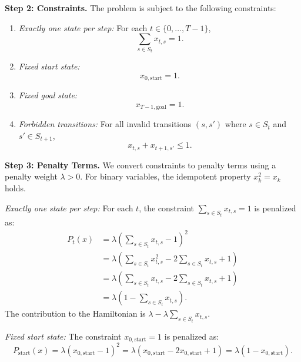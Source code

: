 \documentclass[12pt]{article}
\begin{document}
\textbf{Step 2: Constraints.}
The problem is subject to the following constraints:
\begin{enumerate}
    \item \textit{Exactly one state per step:} For each $t \in \{0, \dots, T-1\}$,
    \begin{equation}
    \sum_{s \in S_t} x_{t,s} = 1.
    \end{equation}
    \item \textit{Fixed start state:}
    \begin{equation}
    x_{0, \text{start}} = 1.
    \end{equation}
    \item \textit{Fixed goal state:}
    \begin{equation}
    x_{T-1, \text{goal}} = 1.
    \end{equation}
    \item \textit{Forbidden transitions:} For all invalid transitions $(s, s')$ where $s \in S_t$ and $s' \in S_{t+1}$,
    \begin{equation}
    x_{t,s} + x_{t+1,s'} \leq 1.
    \end{equation}
\end{enumerate}

\textbf{Step 3: Penalty Terms.}
We convert constraints to penalty terms using a penalty weight $\lambda > 0$. For binary variables, the idempotent property $x_k^2 = x_k$ holds.

\textit{Exactly one state per step:}
For each $t$, the constraint $\sum_{s \in S_t} x_{t,s} = 1$ is penalized as:
\begin{align}
P_t(x) &= \lambda \left( \sum_{s \in S_t} x_{t,s} - 1 \right)^2 \\
&= \lambda \left( \sum_{s \in S_t} x_{t,s}^2 - 2 \sum_{s \in S_t} x_{t,s} + 1 \right) \\
&= \lambda \left( \sum_{s \in S_t} x_{t,s} - 2 \sum_{s \in S_t} x_{t,s} + 1 \right) \\
&= \lambda \left( 1 - \sum_{s \in S_t} x_{t,s} \right).
\end{align}
The contribution to the Hamiltonian is $\lambda - \lambda \sum_{s \in S_t} x_{t,s}$.

\textit{Fixed start state:}
The constraint $x_{0, \text{start}} = 1$ is penalized as:
\begin{equation}
P_{\text{start}}(x) = \lambda (x_{0, \text{start}} - 1)^2 = \lambda (x_{0, \text{start}} - 2x_{0, \text{start}} + 1) = \lambda (1 - x_{0, \text{start}}).
\end{equation}
\end{document}
